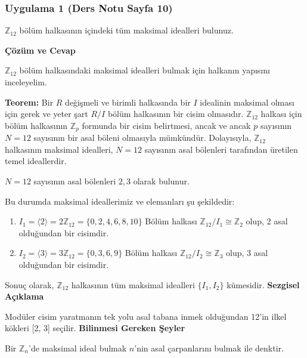 \documentclass[11pt, a4paper]{article}
\newenvironment{cozum}{
    \vspace{0.5cm}
    \noindent\textcolor{green!60!black}{\faCheckCircle\enspace \textbf{\Large Çözüm ve Cevap}}\par\vspace{0.2cm}
}{}
\newenvironment{sezgisel}{
    \vspace{0.5cm}
    \noindent\textcolor{orange!80!black}{\faLightbulb\enspace \textbf{\Large Sezgisel Açıklama}}\par\vspace{0.2cm}
    \itshape
}{}
\newenvironment{bilgi}{
    \vspace{0.5cm}
    \noindent\textcolor{red!70!black}{\faExclamationTriangle\enspace \textbf{\Large Bilinmesi Gereken Şeyler}}\par\vspace{0.2cm}
}{}
\begin{document}
\subsubsection{Uygulama 1 (Ders Notu Sayfa 10)}
\begin{sorubox}
$\mathbb{Z}_{12}$ bölüm halkasının içindeki tüm maksimal idealleri bulunuz.
\end{sorubox}
\begin{cozum}
$\mathbb{Z}_{12}$ bölüm halkasındaki maksimal idealleri bulmak için halkanın yapısını inceleyelim.

\textbf{Teorem:} Bir $R$ değişmeli ve birimli halkasında bir $I$ idealinin maksimal olması için gerek ve yeter şart $R/I$ bölüm halkasının bir cisim olmasıdır. $\mathbb{Z}_{12}$ halkası için bölüm halkasının $\mathbb{Z}_p$ formunda bir cisim belirtmesi, ancak ve ancak $p$ sayısının $N = 12$ sayısının bir asal böleni olmasıyla mümkündür. Dolayısıyla, $\mathbb{Z}_{12}$ halkasının maksimal idealleri, $N = 12$ sayısının asal bölenleri tarafından üretilen temel ideallerdir.

$N = 12$ sayısının asal bölenleri $2, 3$ olarak bulunur.

Bu durumda maksimal ideallerimiz ve elemanları şu şekildedir:
\begin{enumerate}
    \item $I_{1} = \langle 2 \rangle = 2\mathbb{Z}_{12} = \{0, 2, 4, 6, 8, 10\}$
    Bölüm halkası $\mathbb{Z}_{12} / I_{1} \cong \mathbb{Z}_{2}$ olup, $2$ asal olduğundan bir cisimdir.
    \item $I_{2} = \langle 3 \rangle = 3\mathbb{Z}_{12} = \{0, 3, 6, 9\}$
    Bölüm halkası $\mathbb{Z}_{12} / I_{2} \cong \mathbb{Z}_{3}$ olup, $3$ asal olduğundan bir cisimdir.
\end{enumerate}

Sonuç olarak, $\mathbb{Z}_{12}$ halkasının tüm maksimal idealleri $\{I_1, I_2\}$ kümesidir.
\end{cozum}
\begin{sezgisel}
Modüler cisim yaratmanın tek yolu asal tabana inmek olduğundan 12'in ilkel kökleri [2, 3] seçilir.
\end{sezgisel}
\begin{bilgi}
Bir $\mathbb{Z}_n$'de maksimal ideal bulmak $n$'nin asal çarpanlarını bulmak ile denktir.
\end{bilgi}

\newpage
\end{document}
